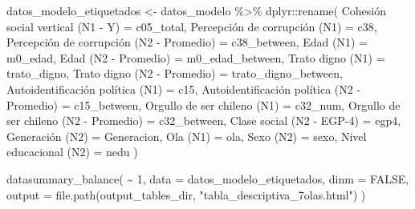 \documentclass[
  spanish,
  a4paper,
  oneside]{scrbook}
\newenvironment{Shaded}{\begin{snugshade}}{\end{snugshade}}
\newcommand{\AttributeTok}[1]{\textcolor[rgb]{0.40,0.45,0.13}{#1}}
\newcommand{\ConstantTok}[1]{\textcolor[rgb]{0.56,0.35,0.01}{#1}}
\newcommand{\DecValTok}[1]{\textcolor[rgb]{0.68,0.00,0.00}{#1}}
\newcommand{\FunctionTok}[1]{\textcolor[rgb]{0.28,0.35,0.67}{#1}}
\newcommand{\NormalTok}[1]{\textcolor[rgb]{0.00,0.23,0.31}{#1}}
\newcommand{\OtherTok}[1]{\textcolor[rgb]{0.00,0.23,0.31}{#1}}
\newcommand{\SpecialCharTok}[1]{\textcolor[rgb]{0.37,0.37,0.37}{#1}}
\newcommand{\StringTok}[1]{\textcolor[rgb]{0.13,0.47,0.30}{#1}}
\begin{document}
\begin{Shaded}
\begin{Highlighting}[]
\NormalTok{datos\_modelo\_etiquetados }\OtherTok{\textless{}{-}}\NormalTok{ datos\_modelo }\SpecialCharTok{\%\textgreater{}\%}
\NormalTok{  dplyr}\SpecialCharTok{::}\FunctionTok{rename}\NormalTok{(}
    \StringTok{\textasciigrave{}}\AttributeTok{Cohesión social vertical (N1 {-} Y)}\StringTok{\textasciigrave{}}             \OtherTok{=}\NormalTok{ c05\_total,}
    \StringTok{\textasciigrave{}}\AttributeTok{Percepción de corrupción (N1)}\StringTok{\textasciigrave{}}                 \OtherTok{=}\NormalTok{ c38,}
    \StringTok{\textasciigrave{}}\AttributeTok{Percepción de corrupción (N2 {-} Promedio)}\StringTok{\textasciigrave{}}      \OtherTok{=}\NormalTok{ c38\_between,}
    \StringTok{\textasciigrave{}}\AttributeTok{Edad (N1)}\StringTok{\textasciigrave{}}                                     \OtherTok{=}\NormalTok{ m0\_edad,}
    \StringTok{\textasciigrave{}}\AttributeTok{Edad (N2 {-} Promedio)}\StringTok{\textasciigrave{}}                          \OtherTok{=}\NormalTok{ m0\_edad\_between,}
    \StringTok{\textasciigrave{}}\AttributeTok{Trato digno (N1)}\StringTok{\textasciigrave{}}                              \OtherTok{=}\NormalTok{ trato\_digno,}
    \StringTok{\textasciigrave{}}\AttributeTok{Trato digno (N2 {-} Promedio)}\StringTok{\textasciigrave{}}                   \OtherTok{=}\NormalTok{ trato\_digno\_between,}
    \StringTok{\textasciigrave{}}\AttributeTok{Autoidentificación política (N1)}\StringTok{\textasciigrave{}}              \OtherTok{=}\NormalTok{ c15,}
    \StringTok{\textasciigrave{}}\AttributeTok{Autoidentificación política (N2 {-} Promedio)}\StringTok{\textasciigrave{}}   \OtherTok{=}\NormalTok{ c15\_between,}
    \StringTok{\textasciigrave{}}\AttributeTok{Orgullo de ser chileno (N1)}\StringTok{\textasciigrave{}}                   \OtherTok{=}\NormalTok{ c32\_num,}
    \StringTok{\textasciigrave{}}\AttributeTok{Orgullo de ser chileno (N2 {-} Promedio)}\StringTok{\textasciigrave{}}        \OtherTok{=}\NormalTok{ c32\_between,}
    \StringTok{\textasciigrave{}}\AttributeTok{Clase social (N2 {-} EGP{-}4)}\StringTok{\textasciigrave{}}                     \OtherTok{=}\NormalTok{ egp4,}
    \StringTok{\textasciigrave{}}\AttributeTok{Generación (N2)}\StringTok{\textasciigrave{}}                               \OtherTok{=}\NormalTok{ Generacion,}
    \StringTok{\textasciigrave{}}\AttributeTok{Ola (N1)}\StringTok{\textasciigrave{}}                                      \OtherTok{=}\NormalTok{ ola,}
    \StringTok{\textasciigrave{}}\AttributeTok{Sexo (N2)}\StringTok{\textasciigrave{}}                                     \OtherTok{=}\NormalTok{ sexo,}
    \StringTok{\textasciigrave{}}\AttributeTok{Nivel educacional (N2)}\StringTok{\textasciigrave{}}                        \OtherTok{=}\NormalTok{ nedu}
\NormalTok{  )}

\FunctionTok{datasummary\_balance}\NormalTok{(}
  \SpecialCharTok{\textasciitilde{}} \DecValTok{1}\NormalTok{,}
  \AttributeTok{data =}\NormalTok{ datos\_modelo\_etiquetados,}
  \AttributeTok{dinm =} \ConstantTok{FALSE}\NormalTok{,}
  \AttributeTok{output =} \FunctionTok{file.path}\NormalTok{(output\_tables\_dir, }\StringTok{"tabla\_descriptiva\_7olas.html"}\NormalTok{)}
\NormalTok{)}
\end{Highlighting}
\end{Shaded}
\end{document}
